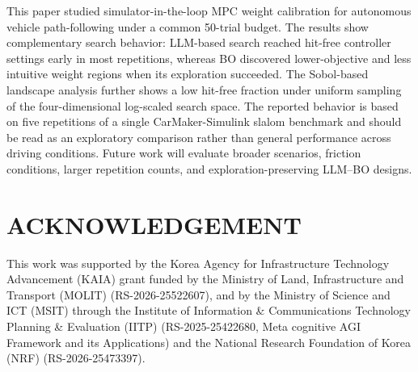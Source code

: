 \documentclass[10pt,twocolumn]{ICCAS}
\begin{document}
This paper studied simulator-in-the-loop MPC weight calibration for autonomous
vehicle path-following under a common 50-trial budget. The results show
complementary search behavior: LLM-based search reached hit-free
controller settings early in most repetitions, whereas BO discovered
lower-objective and less intuitive weight regions when its exploration
succeeded. The Sobol-based landscape analysis further shows a low hit-free
fraction under uniform sampling of the four-dimensional log-scaled search
space. The reported behavior is based on five repetitions of a single
CarMaker-Simulink slalom benchmark and should be read as an exploratory
comparison rather than general performance across driving conditions. Future
work will evaluate broader scenarios, friction conditions, larger repetition
counts, and exploration-preserving LLM--BO designs.

\section*{ACKNOWLEDGEMENT}

This work was supported by the Korea Agency for Infrastructure Technology
Advancement (KAIA) grant funded by the Ministry of Land, Infrastructure and
Transport (MOLIT) (RS-2026-25522607), and by the Ministry of Science and ICT
(MSIT) through the Institute of Information \& Communications Technology
Planning \& Evaluation (IITP) (RS-2025-25422680, Meta cognitive AGI Framework
and its Applications) and the National Research Foundation of Korea (NRF)
(RS-2026-25473397).



\end{document}
